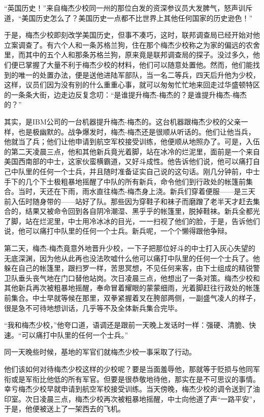     “英国历史！”来自梅杰少校同一州的那位白发的资深参议员大发脾气，怒声训斥道，“美国历史怎么了？美国历史一点都不比世界上其他任何国家的历史逊色！”

    于是，梅杰少校即刻改学美国历史，但事不凑巧，这时，联邦调查局已经开始对他立案调查了。有六个人和一条苏格兰狗，住在那个梅杰少校称之为家的偏远的农舍里，而其中的五个人和那条苏格兰狗，原来竟是联邦调查局的探子。没过多久，他们便已掌握了大量不利于梅杰少校的材料，他们可以随意处置他。然而，他们能找到的唯一的处置办法，便是送他进陆军部队，当一名二等兵，四天后升他为少校，这样，议员们因为没有别的什么重重心事，就可以匆匆忙忙地来回走过华盛顿特区的一条条大街，边走边反复念叨：“是谁提升梅杰-梅杰的？是谁提升梅杰-梅杰的？”

    其实，是IBM公司的一台机器提升梅杰-梅杰的。这台机器跟梅杰少校的父亲一样，也是极幽默的。战争爆发时，梅杰-梅杰还是很顺从听话的。他们让他当兵，他就当了兵；他们让他申请到航空军校接受训练，他便顺从地照办了。可是，入伍的第二天凌晨三点，他和其他新兵竟光着脚，站在冰冷的烂泥里，面前是一个来自美国西南部的中士，这家伙蛮横霸道，又好斗成性。他告诉他们说，他可以痛打自己中队里的任何一个士兵，并且随时准备证实自己说的这句话。刚几分钟前，中士手下的几个下士极粗暴地摇醒了中队的所有新兵，命令他们到行政处的帐篷前集合。当时，天还在下雨，雨水直往梅杰-梅杰身上浇。新兵们穿着便服——是三天前入伍时随身带的——站好了队。那些因为穿鞋子和袜子而磨蹭了老半天才赶去集合的，结果又被命令回到各自阴冷潮湿、黑乎乎的帐篷里，脱掉鞋袜。新兵全都光了脚，站在烂泥里，中士用冷冰冰的目光，一一扫视了他们的脸，于是，告诉他们说，他可以痛打中队里的任何一个士兵。新兵呢，一个个懒得跟他争辩。
 


    第二天，梅杰-梅杰竟意外地晋升少校，一下子把那位好斗的中士打入灰心失望的无底深渊，因为他从此再也没法吹嘘什么他可以痛打中队里的任何一个士兵了。他躲在自己的帐篷里，跟扫罗一样，苦思冥想，不见任何来客，由下士组成的精锐警卫队垂头丧气地在门口替他站岗。次日凌晨三点，他想出了一条对策。梅杰少校和其他新兵再次被粗暴地摇醒，奉命冒着耀眼的蒙蒙细雨，光着脚赶往行政处的帐篷前集合。中士早就等候在那里，双拳紧握着叉在胯部两侧，一副盛气凌人的样子，很是急不可待地想训话，几乎等不及全体新兵集合完毕。

    “我和梅杰少校，”他夸口道，语调还是跟前一天晚上发话时一样：强硬、清脆、快速。“可以痛打中队里的任何一个士兵。”

    同一天晚些时候，基地的军官们就梅杰少校一事采取了行动。

    他们该如何对待梅杰少校这样的少校呢？要是当面羞辱他，那就等于贬损与他同军衔或是军衔比他低的所有军官。但要是很恭敬地待他，那实在是不可思议的事情。幸亏梅杰少校早就申请到航空军校接受训练。当天傍晚，梅杰少校的调令送到了油印室。次日凌晨三点，梅杰少校再次被粗暴地摇醒，中士向他道了声“一路平安”，于是，他便被送上了一架西去的飞机。

